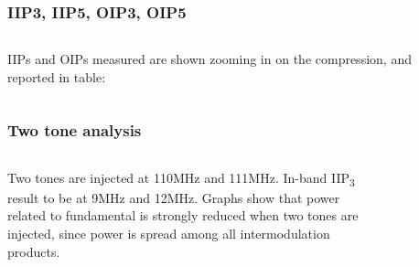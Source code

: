 \begin{frame}
\frametitle{IIP3, IIP5, OIP3, OIP5}
\begin{columns}
	IIPs and OIPs measured are shown zooming in on the compression, and reported in table:
	\begin{table}[H]
		\label{tab:IIP3_1tone}
		\centering	
	\end{table}
	\end{columns}
	\begin{figure}[H] 
		\centering
		\label{fig:IIP3_1t_schem}
	\end{figure}
\end{frame}


\begin{frame}
\frametitle{Two tone analysis}
\begin{columns}
	 Two tones are injected at 110MHz and 111MHz. In-band IIP\textsubscript{3} result to be at 9MHz and 12MHz. Graphs show that power related to fundamental is strongly reduced when two tones are injected, since power is spread among all intermodulation products.
	\begin{figure}[H] 
		\centering
		\\
		\label{fig:1dB_2tones}
	\end{figure}
\end{columns}
\end{frame}


